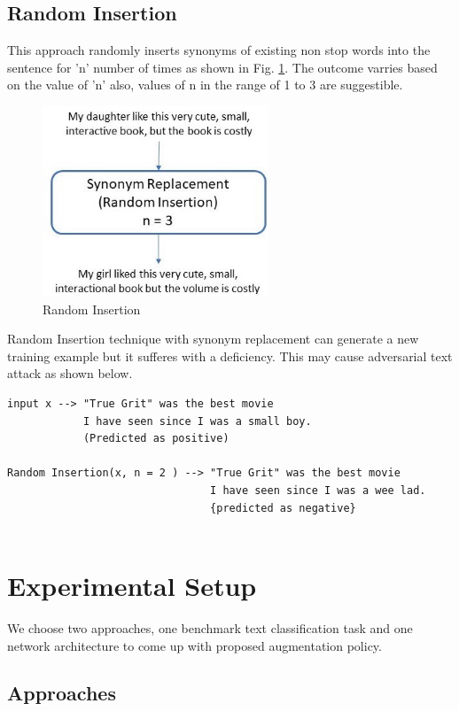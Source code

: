 \documentclass{article}
\begin{document}
\subsection{Random Insertion}
This approach randomly inserts synonyms of existing non stop words into the sentence for 'n' number of times as shown in Fig. \ref{fig:randominsert}. The outcome varries based on the value of 'n' also, values of n in the range of 1 to 3 are suggestible. 
\begin{figure}[h!]
\centering
  \includegraphics[width=0.6\textwidth]{random insertion.jpg}
  \caption{Random Insertion}
  \label{fig:randominsert}
\end{figure}

Random Insertion technique with synonym replacement can generate a new training example but it sufferes with a deficiency. This may cause adversarial text attack as shown below.
\begin{lstlisting}
input x --> "True Grit" was the best movie 
            I have seen since I was a small boy.  
            (Predicted as positive)

Random Insertion(x, n = 2 ) --> "True Grit" was the best movie 
                                I have seen since I was a wee lad. 
                                {predicted as negative}
			
\end{lstlisting}

\section{Experimental Setup}
We choose two approaches, one benchmark text classification task and one network architecture to come up with proposed augmentation policy.
\subsection{Approaches}
\end{document}
